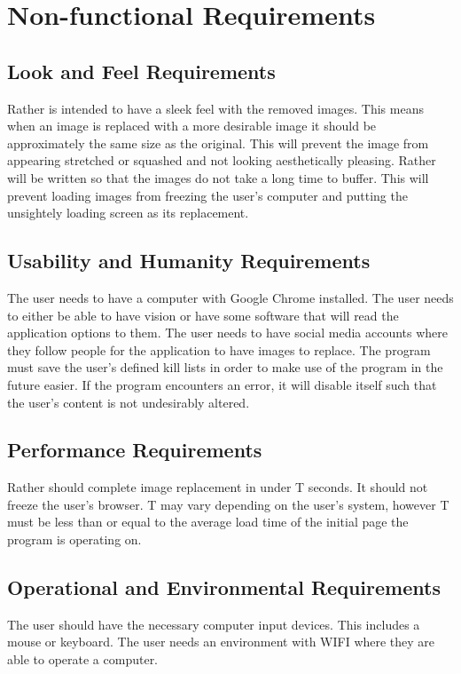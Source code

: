 \documentclass[12pt, titlepage]{article}
\begin{document}
\section{Non-functional Requirements}

\subsection{Look and Feel Requirements}
Rather is intended to have a sleek feel with the removed images. This means when an image is replaced with a more desirable image it should be approximately the same size as the original. This will prevent the image from appearing stretched or squashed and not looking aesthetically pleasing. Rather will be written so that the images do not take a long time to buffer. This will prevent loading images from freezing the user's computer and putting the unsightely loading screen as its replacement. 

\subsection{Usability and Humanity Requirements}
The user needs to have a computer with Google Chrome installed. The user needs to either be able to have vision or have some software that will read the application options to them. The user needs to have social media accounts where they follow people for the application to have images to replace. The program must save the user's defined kill lists in order to make use of the program in the future easier. If the program encounters an error, it will disable itself such that the user's content is not undesirably altered.

\subsection{Performance Requirements}
Rather should complete image replacement in under T seconds. It should not freeze the user's browser. T may vary depending on the user's system, however T must be less than or equal to the average load time of the initial page the program is operating on.
\subsection{Operational and Environmental Requirements}
The user should have the necessary computer input devices. This includes a mouse or keyboard. The user needs an environment with WIFI where they are able to operate a computer.
\end{document}
